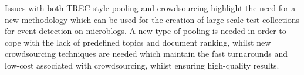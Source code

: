 Issues with both TREC-style pooling and crowdsourcing highlight the need for a new methodology which can be used for the creation of large-scale test collections for event detection on microblogs. A new type of pooling is needed in order to cope with the lack of predefined topics and document ranking, whilst new crowdsourcing techniques are needed which maintain the fast turnarounds and low-cost associated with crowdsourcing, whilst ensuring high-quality results.